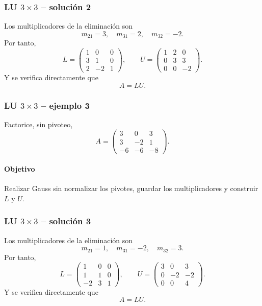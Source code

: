 \subsubsection*{LU $3\times 3$ -- solución 2}

Los multiplicadores de la eliminación son
\[
m_{21}=3,\quad m_{31}=2,\quad m_{32}=-2.
\]
Por tanto,
\[
L=\begin{pmatrix}1 & 0 & 0\\3 & 1 & 0\\2 & -2 & 1\end{pmatrix},\qquad U=\begin{pmatrix}1 & 2 & 0\\0 & 3 & 3\\0 & 0 & -2\end{pmatrix}.
\]
Y se verifica directamente que
\[
\boxed{A=LU}.
\]


\subsubsection*{LU $3\times 3$ -- ejemplo 3}

Factorice, sin pivoteo,
\[
A=\begin{pmatrix}3 & 0 & 3\\3 & -2 & 1\\-6 & -6 & -8\end{pmatrix}.
\]

\paragraph{Objetivo}
Realizar Gauss sin normalizar los pivotes, guardar los multiplicadores y construir $L$ y $U$.



\subsubsection*{LU $3\times 3$ -- solución 3}

Los multiplicadores de la eliminación son
\[
m_{21}=1,\quad m_{31}=-2,\quad m_{32}=3.
\]
Por tanto,
\[
L=\begin{pmatrix}1 & 0 & 0\\1 & 1 & 0\\-2 & 3 & 1\end{pmatrix},\qquad U=\begin{pmatrix}3 & 0 & 3\\0 & -2 & -2\\0 & 0 & 4\end{pmatrix}.
\]
Y se verifica directamente que
\[
\boxed{A=LU}.
\]


